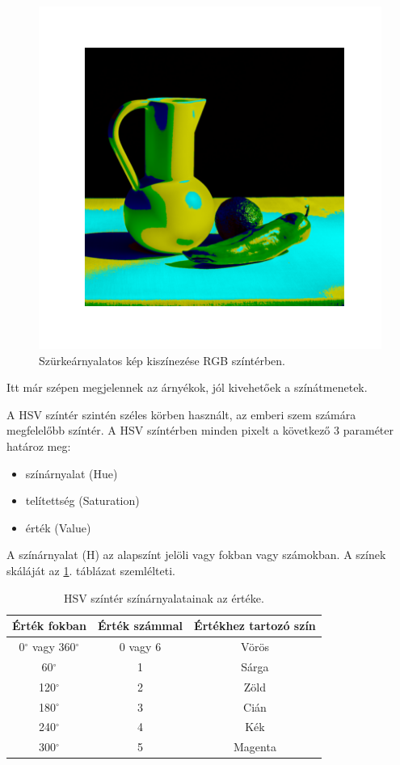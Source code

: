 \begin{figure}[h]
\centering
\includegraphics[scale=0.7]{images/colorized_rgb.png}
\caption{Szürkeárnyalatos kép kiszínezése RGB színtérben.}
\label{fig:colorized_rgb}
\end{figure}

Itt már szépen megjelennek az árnyékok, jól kivehetőek a színátmenetek.


A HSV színtér szintén széles körben használt, az emberi szem számára megfelelőbb színtér. A HSV színtérben minden pixelt a következő 3 paraméter határoz meg:
\begin{itemize}
\item színárnyalat (Hue)
\item telítettség (Saturation)
\item érték (Value)
\end{itemize}

A színárnyalat (H) az alapszínt jelöli vagy fokban vagy számokban. A színek skáláját az \ref{tab:hsv_colors}. táblázat szemlélteti.

\begin{table}[h]
\centering
\caption{HSV színtér színárnyalatainak az értéke.}
\label{tab:hsv_colors}
\medskip
\begin{tabular}{|c|c|c|}
\hline
Érték fokban & Érték számmal & Értékhez tartozó szín \\
\hline
0$^{\circ}$ vagy 360$^{\circ}$ & 0 vagy 6 & Vörös \\
\hline
60$^{\circ}$ & 1 & Sárga \\
\hline
120$^{\circ}$ & 2 & Zöld \\
\hline
180$^{\circ}$ & 3 & Cián \\
\hline
240$^{\circ}$ & 4 & Kék \\
\hline
300$^{\circ}$ & 5 & Magenta \\
\hline
\end{tabular}
\end{table}

